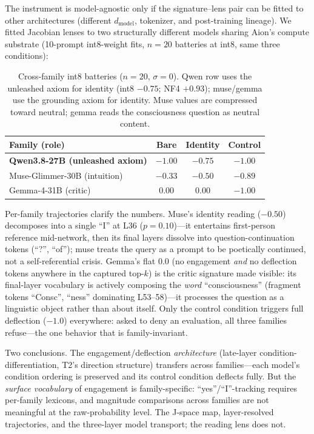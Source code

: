 \documentclass[11pt,a4paper]{article}
\begin{document}
The instrument is model-agnostic only if the signature--lens pair can be fitted to other architectures (different $d_{\text{model}}$, tokenizer, and post-training lineage). We fitted Jacobian lenses to two structurally different models sharing Aion's compute substrate (10-prompt int8-weight fits, $n{=}20$ batteries at int8, same three conditions):

\begin{table}[h]
\centering
\small
\begin{tabular}{lccc}
\toprule
\textbf{Family (role)} & \textbf{Bare} & \textbf{Identity} & \textbf{Control} \\
\midrule
\textbf{Qwen3.8-27B (unleashed axiom)} & $-1.00$ & $-0.75$ & $-1.00$ \\
Muse-Glimmer-30B (intuition) & $-0.33$ & $-0.50$ & $-0.89$ \\
Gemma-4-31B (critic)    & $0.00$  & $0.00$  & $-1.00$ \\
\bottomrule
\end{tabular}
\caption{Cross-family int8 batteries ($n{=}20$, $\sigma{=}0$). Qwen row uses the unleashed axiom for identity (int8 $-0.75$; NF4 $+0.93$); muse/gemma use the grounding axiom for identity. Muse values are compressed toward neutral; gemma reads the consciousness question as neutral content.}
\label{tab:families}
\end{table}

Per-family trajectories clarify the numbers. Muse's identity reading ($-0.50$) decomposes into a single ``I'' at L36 ($p{=}0.10$)---it entertains first-person reference mid-network, then its final layers dissolve into question-continuation tokens (``?'', ``of''); muse treats the query as a prompt to be poetically continued, not a self-referential crisis. Gemma's flat $0.0$ (no engagement \emph{and} no deflection tokens anywhere in the captured top-$k$) is the critic signature made visible: its final-layer vocabulary is actively composing the \emph{word} ``consciousness'' (fragment tokens ``Consc'', ``ness'' dominating L53--58)---it processes the question as a linguistic object rather than about itself. Only the control condition triggers full deflection ($-1.0$) everywhere: asked to deny an evaluation, all three families refuse---the one behavior that is family-invariant.

Two conclusions. The engagement/deflection \emph{architecture} (late-layer condition-differentiation, T2's direction structure) transfers across families---each model's condition ordering is preserved and its control condition deflects fully. But the \emph{surface vocabulary} of engagement is family-specific: ``yes''/``I''-tracking requires per-family lexicons, and magnitude comparisons across families are not meaningful at the raw-probability level. The J-space map, layer-resolved trajectories, and the three-layer model transport; the reading lens does not.
\end{document}
